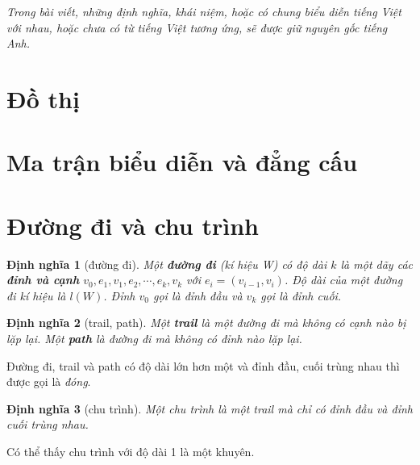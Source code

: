\documentclass[14pt]{extarticle}
\newtheorem{definition}{Định nghĩa}[section]
\begin{document}
\hspace{1cm}\vfill
\begin{center}
	\textit{Trong bài viết, những định nghĩa, khái niệm, hoặc có chung biểu diễn tiếng Việt với nhau, hoặc chưa có từ tiếng Việt tương ứng, sẽ được giữ nguyên gốc tiếng Anh.}
\end{center}
\vfill

\pagebreak
\section{Đồ thị}


\section{Ma trận biểu diễn và đẳng cấu}


\section{Đường đi và chu trình}
\begin{definition}
	[đường đi]
	Một \textbf{đường đi} (kí hiệu W) có độ dài $k$ là một dãy các \textbf{đỉnh và cạnh} $v_0, e_1, v_1, e_2,\cdots,e_k,v_k$ với $e_i = (v_{i-1},v_i)$. Độ dài của một đường đi kí hiệu là $l(W)$. Đỉnh $v_0$ gọi là đỉnh đầu và $v_k$ gọi là đỉnh cuối.
\end{definition}
\begin{definition}
	[trail, path]	Một \textbf{trail} là một đường đi mà không có cạnh nào bị lặp lại. Một \textbf{path} là đường đi mà không có đỉnh nào lặp lại.
\end{definition}
Đường đi, trail và path có độ dài lớn hơn một và đỉnh đầu, cuối trùng nhau thì được gọi là \textit{đóng}.
\begin{definition}
	[chu trình] Một chu trình là một trail mà chỉ có đỉnh đầu và đỉnh cuối trùng nhau.
\end{definition}
Có thể thấy chu trình với độ dài 1 là một khuyên.
\end{document}
